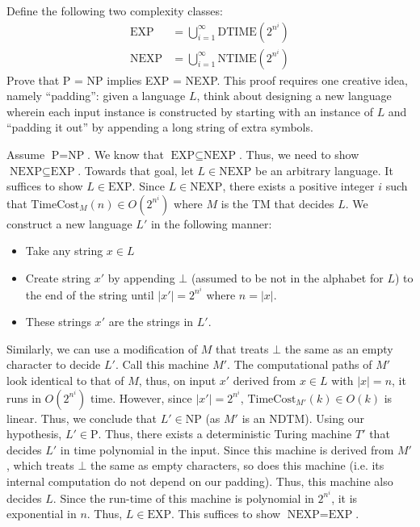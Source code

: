 \documentclass[12pt]{article}
\begin{document}
\newpage

\begin{problem}{2}
    Define the following two complexity classes:
    \begin{align*}
        \text{EXP} &= \bigcup_{i=1}^{\infty} \text{DTIME}\left(2^{n^i}\right) \\
        \text{NEXP} &= \bigcup_{i=1}^{\infty} \text{NTIME}\left(2^{n^i}\right)
    \end{align*}
    Prove that P = NP implies EXP = NEXP. This proof requires one creative idea, namely ``padding'': given a language $L$,
    think about designing a new language wherein each input instance is constructed by starting with an instance of $L$ and
    ``padding it out'' by appending a long string of extra symbols. 
\end{problem}
\begin{solution}
    Assume $\text{P} = \text{NP}$. We know that $\text{EXP} \subseteq \text{NEXP}$. Thus, we need to show $\text{NEXP} \subseteq \text{EXP}$. Towards that goal, let $L \in \text{NEXP}$ be an arbitrary language. It suffices to show $L \in \text{EXP}$. \bbni
    Since $L \in \text{NEXP}$, there exists a positive integer $i$ such that $\text{TimeCost}_M(n) \in O(2^{n^i})$ where $M$ is the TM that decides $L$. We construct a new language $L'$ in the following manner: 
    \begin{itemize}
        \item Take any string $x \in L$
        \item Create string $x'$ by appending $\bot$ (assumed to be not in the alphabet for $L$) to the end of the string until $|x'| = 2^{n^i}$ where $n = |x|$. 
        \item These strings $x'$ are the strings in $L'$. 
    \end{itemize}
    Similarly, we can use a modification of $M$ that treats $\bot$ the same as an empty character to decide $L'$. Call this machine $M'$. \bbni 
    The computational paths of $M'$ look identical to that of $M$, thus, on input $x'$ derived from $x \in L$ with $|x| = n$, it runs in $O(2^{n^i})$ time. However, since $|x'| = 2^{n^i}$, $\text{TimeCost}_{M'}(k) \in O(k)$ is linear. Thus, we conclude that $L' \in \text{NP}$ (as $M'$ is an NDTM). \bbni 
    Using our hypothesis, $L' \in \text{P}$. Thus, there exists a deterministic Turing machine $T'$ that decides $L'$ in time polynomial in the input. Since this machine is derived from $M'$, which treats $\bot$ the same as empty characters, so does this machine (i.e. its internal computation do not depend on our padding). Thus, this machine also decides $L$. \bbni 
    Since the run-time of this machine is polynomial in $2^{n^i}$, it is exponential in $n$. Thus, $L \in \text{EXP}$. This suffices to show $\text{NEXP} = \text{EXP}$. 

\end{solution}
\end{document}
